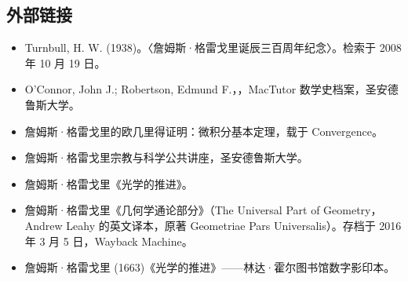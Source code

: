 \subsection{外部链接}
\begin{itemize}
\item Turnbull, H. W. (1938)。〈詹姆斯·格雷戈里诞辰三百周年纪念〉。检索于 2008 年 10 月 19 日。
\item O'Connor, John J.; Robertson, Edmund F.，，MacTutor 数学史档案，圣安德鲁斯大学。
\item 詹姆斯·格雷戈里的欧几里得证明：微积分基本定理，载于 Convergence。
\item 詹姆斯·格雷戈里宗教与科学公共讲座，圣安德鲁斯大学。
\item 詹姆斯·格雷戈里《光学的推进》。
\item 詹姆斯·格雷戈里《几何学通论部分》（The Universal Part of Geometry，Andrew Leahy 的英文译本，原著 Geometriae Pars Universalis）。存档于 2016 年 3 月 5 日，Wayback Machine。
\item 詹姆斯·格雷戈里 (1663)《光学的推进》——林达·霍尔图书馆数字影印本。
\end{itemize}
